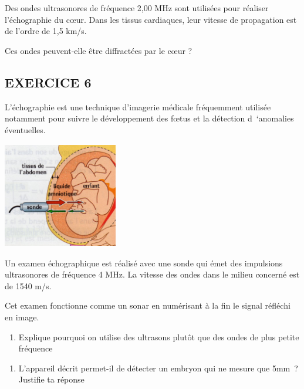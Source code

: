{{{{{{{{{{Des ondes ultrasonores de fréquence 2,00 MHz sont utilisées pour
réaliser l'échographie du cœur. Dans les tissus cardiaques, leur vitesse
de propagation est de l'ordre de 1,5 km/s.

Ces ondes peuvent-elle être diffractées par le cœur ?
\subsection{EXERCICE 6}

L'échographie est une technique d'imagerie médicale fréquemment utilisée
notamment pour suivre le développement des fœtus et la détection
d~`anomalies éventuelles.

\includegraphics[width=5.009cm,height=4.621cm]{Pictures/1000000000000301000002BCCF7FB7734DEACB0A.jpg}

Un examen échographique est réalisé avec une sonde qui émet des
impulsions ultrasonores de fréquence 4 MHz. La vitesse des ondes dans le
milieu concerné est de 1540 m/s.

Cet examen fonctionne comme un sonar en numérisant à la fin le signal
réfléchi en image.

\begin{enumerate}
\def\labelenumi{\alph{enumi})}
\tightlist
\item
  Explique pourquoi on utilise des ultrasons plutôt que des ondes de
  plus petite fréquence
\end{enumerate}

\begin{enumerate}
\def\labelenumi{\alph{enumi})}
\tightlist
\item
  L'appareil décrit permet-il de détecter un embryon qui ne mesure que
  5mm~? Justifie ta réponse
\end{enumerate}

}}}}}}}}}}
